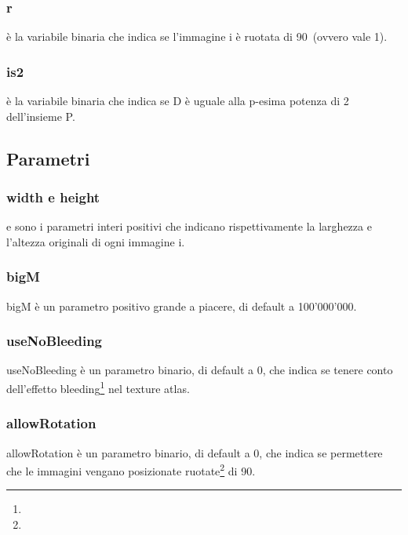 \subsubsection{r}

{\ri} è la variabile binaria che indica se l'immagine i è ruotata di 90\degree\ (ovvero \ri{} vale 1).

\subsubsection{is2}
\isTp{} è la variabile binaria che indica se D è uguale alla p-esima potenza di 2 dell'insieme P.








\subsection{Parametri}

\subsubsection{width e height}

\widthi{} e \heighti{} sono i parametri interi positivi che indicano rispettivamente la larghezza e l'altezza originali di ogni immagine i.

\subsubsection{bigM}
bigM è un parametro positivo grande a piacere, di default a 100’000’000. %

\subsubsection{useNoBleeding}
useNoBleeding è un parametro binario, di default a 0, che indica se tenere conto dell'effetto bleeding\footnote{\footBleeding} nel texture atlas. 

\subsubsection{allowRotation}
allowRotation è un parametro binario, di default a 0, che indica se permettere che le immagini vengano posizionate ruotate\footnote{\footRotation} di 90\degree.%


